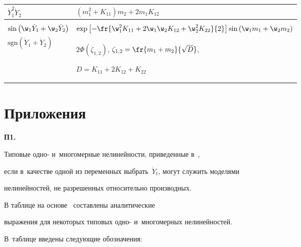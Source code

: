 {\begin{table}
\begin{center}
\begin{tabular}{|p{36mm}|p{86mm}|}
$\dot Y_1^2 \dot Y_2$&$\left(m_1^2 + K_{11}\right) m_2 +2m_1 K_{12}$\\[3pt]

\hline

&\\[-8pt]

$\sin \left(\w_1\dot Y_1 +\w_2\dot Y_2\right)$&

$\exp \left[ -\fr{\w_1^2 K_{11} + 2 \w_1\w_2 K_{12} +\w_2^2 K_{22}}{2}\right] \sin 

\left(\w_1m_1+\w_2m_2\right)$\\[8pt]

\hline

$\mathrm{sgn} \left(\dot Y_1 +\dot Y_2\right)$&

$2\Phi \left(\zeta_{1,2}\right)$, $\zeta_{1,2} =\fr{m_1+m_2 }{\sqrt{D}}$, 

$ D= K_{11} + 2 K_{12} + K_{22}$\\

\hline

\end{tabular}

\end{center}

\end{table}



\vspace*{-12pt}



\section*{\raggedleft Приложения}





\noindent

\textbf{П1.}\

Типовые одно- и~многомерные нелинейности, приведенные в~\cite{4-s2}, 

если в~качестве одной из переменных выбрать~$\dot Y_t$, могут служить моделями 

нелинейностей, не разрешенных относительно производных.



В таблице на основе~\cite{4-s2} составлены аналитические 

выражения для некоторых типовых одно- и~многомерных нелинейностей. 

В~таблице введены следующие обозначения:



}
